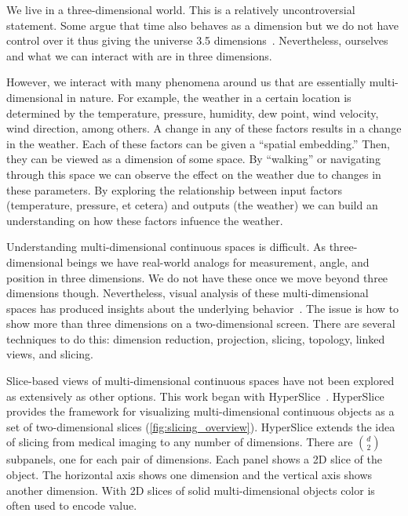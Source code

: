 
We live in a three-dimensional world. This is a relatively uncontroversial
statement. Some argue that time also behaves as a dimension but we do not have
control over it thus giving the universe 3.5 dimensions~\cite{Minkowski:1908}.
Nevertheless, ourselves and what we can interact with are in three dimensions.

However, we interact with many phenomena around us that are essentially
multi-dimensional in nature. For example, the weather in a certain location is
determined by the temperature, pressure, humidity, dew point, wind velocity,
wind direction, among others. A change in any of these factors results in a
change in the weather. Each of these factors can be given a ``spatial
embedding.'' Then, they can be viewed as a dimension of some space.  By
``walking'' or navigating through this space we can observe the effect on the
weather due to changes in these parameters. By exploring the relationship
between input factors (temperature, pressure, et cetera) and outputs (the
weather) we can build an understanding on how these factors infuence the
weather.

Understanding multi-dimensional continuous spaces is difficult. As
three-dimensional beings we have real-world analogs for measurement,
angle, and position in three dimensions. We do not have these once we
move beyond three dimensions though. Nevertheless, visual analysis of
these multi-dimensional spaces has produced insights about the
underlying behavior~\cite{Sedlmair:2014}. The issue is how to show more
than three dimensions on a two-dimensional screen. There are several
techniques to do this: dimension reduction, projection, slicing,
topology, linked views, and slicing.

Slice-based views of multi-dimensional continuous spaces have not been explored
as extensively as other options.  This work began with
HyperSlice~\cite{Wijk:1993}. HyperSlice provides the framework for visualizing
multi-dimensional continuous objects as a set of two-dimensional slices
(\autoref{fig:slicing_overview}). HyperSlice extends the idea of slicing
from medical imaging to any number of dimensions. There are $d \choose 2$
subpanels, one for each pair of dimensions. Each panel shows a 2D slice
of the object. The horizontal axis shows one dimension and the vertical 
axis shows another dimension. With 2D slices of solid multi-dimensional objects
color is often used to encode value. 

